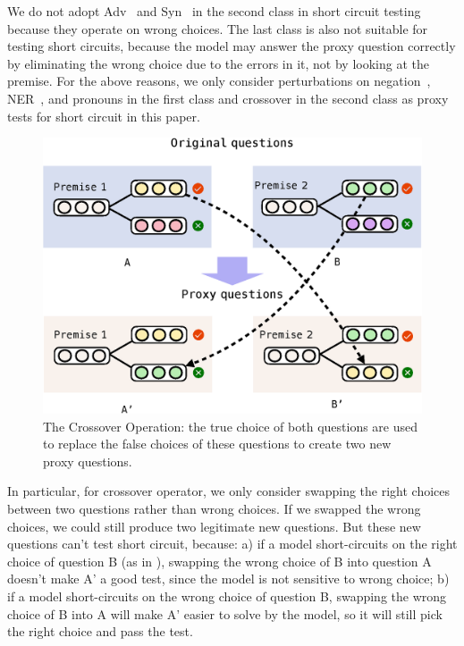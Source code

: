We do not adopt Adv~\cite{wsp2020acl} and Syn~\cite{checklist2020acl,wsp2020acl} in the second class in short circuit testing because they operate on wrong choices. The last class is also not suitable for testing
short circuits, because the model may answer the proxy question
correctly by eliminating the wrong choice due to
the errors in it, not by looking at the premise. For the above reasons, we only consider perturbations on 
negation~\cite{checklist2020acl}, NER~\cite{checklist2020acl}, 
and pronouns in the first class and 
crossover in the second class as proxy tests for short circuit
in this paper.
 \begin{figure}[t!]
 	\centering
 	\includegraphics[width=\columnwidth]{figure/cross.eps}
 	\caption{The Crossover Operation: the true choice of both questions
 		are used to replace the false choices of these questions to create
 		two new proxy questions.}
 	\label{fig:cross}
 \end{figure}

In particular, for crossover operator, we only consider swapping the right choices between two questions 
rather than wrong choices. If we swapped the wrong choices, we could 
still produce two legitimate new questions. But these new questions can't
test short circuit, because: a) if a model
short-circuits on the right choice of question B (as in ), 
swapping the wrong choice of B into question A doesn't make A' a good test, 
since the model is not sensitive to wrong choice; 
b) if a model short-circuits on the wrong choice of
question B, swapping the wrong choice of B into A will make A' 
easier to solve by the model, so it will 
still pick the right choice and pass the test.


